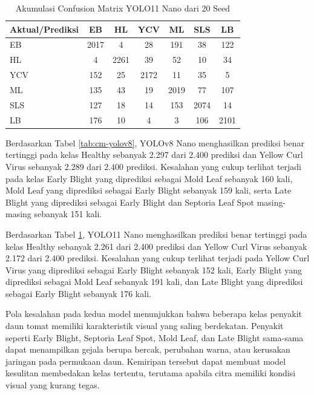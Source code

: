 \begin{sectioncontent}
\begin{subsectioncontent}
        \begin{table}[H]
            \centering
            \caption{Akumulasi Confusion Matrix YOLO11 Nano dari 20 Seed}
            \label{tab:cm-yolo11}
            \begin{tabular}{|l|c|c|c|c|c|c|}
                \hline
                \textbf{Aktual/Prediksi} & \textbf{EB} & \textbf{HL} & \textbf{YCV} & \textbf{ML} & \textbf{SLS} & \textbf{LB} \\
                \hline
                EB & 2017 & 4 & 28 & 191 & 38 & 122 \\
                \hline
                HL & 4 & 2261 & 39 & 52 & 10 & 34 \\
                \hline
                YCV & 152 & 25 & 2172 & 11 & 35 & 5 \\
                \hline
                ML & 135 & 43 & 19 & 2019 & 77 & 107 \\
                \hline
                SLS & 127 & 18 & 14 & 153 & 2074 & 14 \\
                \hline
                LB & 176 & 10 & 4 & 3 & 106 & 2101 \\
                \hline
            \end{tabular}
        \end{table}

        Berdasarkan Tabel \ref{tab:cm-yolov8}, YOLOv8 Nano menghasilkan prediksi benar tertinggi pada kelas Healthy sebanyak 2.297 dari 2.400 prediksi dan Yellow Curl Virus sebanyak 2.289 dari 2.400 prediksi. Kesalahan yang cukup terlihat terjadi pada kelas Early Blight yang diprediksi sebagai Mold Leaf sebanyak 160 kali, Mold Leaf yang diprediksi sebagai Early Blight sebanyak 159 kali, serta Late Blight yang diprediksi sebagai Early Blight dan Septoria Leaf Spot masing-masing sebanyak 151 kali.

        Berdasarkan Tabel \ref{tab:cm-yolo11}, YOLO11 Nano menghasilkan prediksi benar tertinggi pada kelas Healthy sebanyak 2.261 dari 2.400 prediksi dan Yellow Curl Virus sebanyak 2.172 dari 2.400 prediksi. Kesalahan yang cukup terlihat terjadi pada Yellow Curl Virus yang diprediksi sebagai Early Blight sebanyak 152 kali, Early Blight yang diprediksi sebagai Mold Leaf sebanyak 191 kali, dan Late Blight yang diprediksi sebagai Early Blight sebanyak 176 kali.

        Pola kesalahan pada kedua model menunjukkan bahwa beberapa kelas penyakit daun tomat memiliki karakteristik visual yang saling berdekatan. Penyakit seperti Early Blight, Septoria Leaf Spot, Mold Leaf, dan Late Blight sama-sama dapat menampilkan gejala berupa bercak, perubahan warna, atau kerusakan jaringan pada permukaan daun. Kemiripan tersebut dapat membuat model kesulitan membedakan kelas tertentu, terutama apabila citra memiliki kondisi visual yang kurang tegas.
    \end{subsectioncontent}


\end{sectioncontent}

